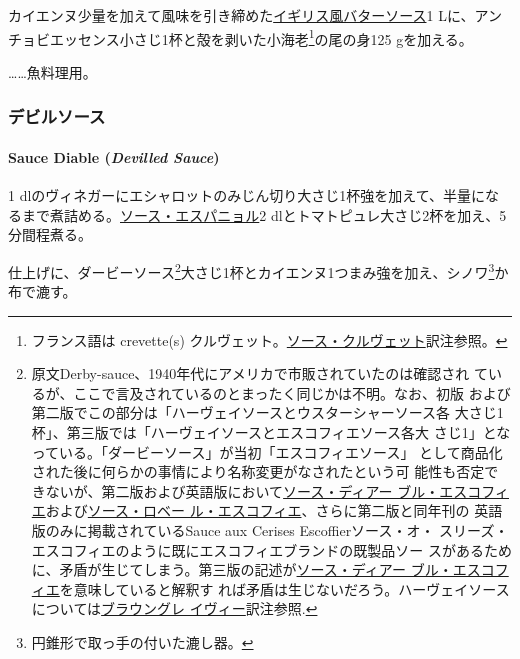 \begin{recette}
カイエンヌ少量を加えて風味を引き締めた\protect\hyperlink{butter-sauce}{イギリス風バターソース}1
Lに、アンチョビエッセンス小さじ1杯と殻を剥いた小海老\footnote{フランス語は
  crevette(s)
  クルヴェット。\protect\hyperlink{sauce-aux-crevettes}{ソース・クルヴェット}訳注参照。}の尾の身125
gを加える。

\ldots{}\ldots{}魚料理用。

\maeaki

\hypertarget{ux30c7ux30d3ux30ebux30bdux30fcux30b9}{%
\subsubsection{デビルソース}\label{ux30c7ux30d3ux30ebux30bdux30fcux30b9}}

\hypertarget{devilled-sauce}{%
\paragraph{\texorpdfstring{Sauce Diable (\emph{Devilled
Sauce})}{Sauce Diable (Devilled Sauce)}}\label{devilled-sauce}}


1\undemi{}
dlのヴィネガーにエシャロットのみじん切り大さじ1杯強を加えて、半量になるまで煮詰める。\protect\hyperlink{sauce-espagnole}{ソース・エスパニョル}2\undemi{}
dlとトマトピュレ大さじ2杯を加え、5分間程煮る。

仕上げに、ダービーソース\footnote{原文Derby-sauce、1940年代にアメリカで市販されていたのは確認され
  ているが、ここで言及されているのとまったく同じかは不明。なお、初版
  および第二版でこの部分は「ハーヴェイソースとウスターシャーソース各
  大さじ1杯」、第三版では「ハーヴェイソースとエスコフィエソース各大
  さじ1」となっている。「ダービーソース」が当初「エスコフィエソース」
  として商品化された後に何らかの事情により名称変更がなされたという可
  能性も否定できないが、第二版および英語版において\protect\hyperlink{sauce-diable-escoffier}{ソース・ディアー
  ブル・エスコフィエ}および\protect\hyperlink{sauce-robert-escoffier}{ソース・ロベー
  ル・エスコフィエ}、さらに第二版と同年刊の
  英語版のみに掲載されているSauce aux Cerises Escoffierソース・オ・
  スリーズ・エスコフィエのように既にエスコフィエブランドの既製品ソー
  スがあるために、矛盾が生じてしまう。第三版の記述が\protect\hyperlink{sauce-diable-escoffier}{ソース・ディアー
  ブル・エスコフィエ}を意味していると解釈す
  れば矛盾は生じないだろう。ハーヴェイソースについては\protect\hyperlink{brown-gravy}{ブラウングレ
  イヴィー}訳注参照.}大さじ1杯とカイエンヌ1つまみ強を加え、シノワ\footnote{円錐形で取っ手の付いた漉し器。}か布で漉す。


\end{recette}

